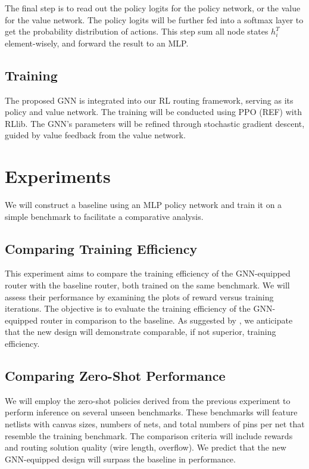 \documentclass[letterpaper]{article}
\begin{document}
The final step is to read out the policy logits for the policy network, or the value for the value network. The policy logits will be further fed into a softmax layer to get the probability distribution of actions. This step sum all node states $h_i^T$ element-wisely, and forward the result to an MLP.
\subsection{Training}
The proposed GNN is integrated into our RL routing framework, serving as its policy and value network. The training will be conducted using PPO (REF) with RLlib. The GNN's parameters will be refined through stochastic gradient descent, guided by value feedback from the value network.

    
\section{Experiments}
We will construct a baseline using an MLP policy network and train it on a simple benchmark to facilitate a comparative analysis.

\subsection{Comparing Training Efficiency}
This experiment aims to compare the training efficiency of the GNN-equipped router with the baseline router, both trained on the same benchmark. We will assess their performance by examining the plots of reward versus training iterations. The objective is to evaluate the training efficiency of the GNN-equipped router in comparison to the baseline. As suggested by \cite{Wang2018}, we anticipate that the new design will demonstrate comparable, if not superior, training efficiency.

\subsection{Comparing Zero-Shot Performance} \label{m:0}
We will employ the zero-shot policies derived from the previous experiment to perform inference on several unseen benchmarks. These benchmarks will feature netlists with canvas sizes, numbers of nets, and total numbers of pins per net that resemble the training benchmark. The comparison criteria will include rewards and routing solution quality (wire length, overflow). We predict that the new GNN-equipped design will surpass the baseline in performance.
\end{document}
